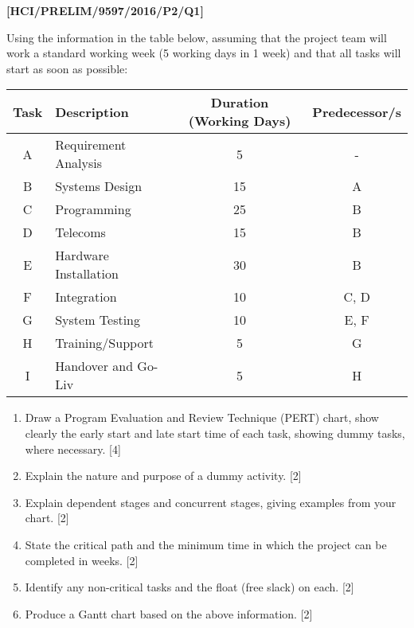 \item \textbf{{[}HCI/PRELIM/9597/2016/P2/Q1{]} }

Using the information in the table below, assuming that the project
team will work a standard working week (5 working days in 1 week)
and that all tasks will start as soon as possible: 
\noindent \begin{center}
\begin{tabular}{|c|l|c|c|}
\hline 
Task & Description & Duration (Working Days) & Predecessor/s \tabularnewline
\hline 
A & Requirement Analysis & 5 & -\tabularnewline
\hline 
B & Systems Design & 15 & A\tabularnewline
\hline 
C & Programming & 25 & B\tabularnewline
\hline 
D & Telecoms & 15 & B\tabularnewline
\hline 
E & Hardware Installation & 30 & B\tabularnewline
\hline 
F & Integration & 10 & C, D\tabularnewline
\hline 
G & System Testing & 10 & E, F\tabularnewline
\hline 
H & Training/Support & 5 & G\tabularnewline
\hline 
I & Handover and Go-Liv & 5 & H\tabularnewline
\hline 
\end{tabular}
\par\end{center}
\begin{enumerate}
\item Draw a Program Evaluation and Review Technique (PERT) chart, show
clearly the early start and late start time of each task, showing
dummy tasks, where necessary. \hfill{}{[}4{]}
\item Explain the nature and purpose of a dummy activity. \hfill{}{[}2{]}
\item Explain dependent stages and concurrent stages, giving examples from
your chart. \hfill{}{[}2{]}
\item State the critical path and the minimum time in which the project
can be completed in weeks.\hfill{} {[}2{]}
\item Identify any non-critical tasks and the float (free slack) on each.\hfill{}
{[}2{]}
\item Produce a Gantt chart based on the above information.\hfill{} {[}2{]}
\end{enumerate}